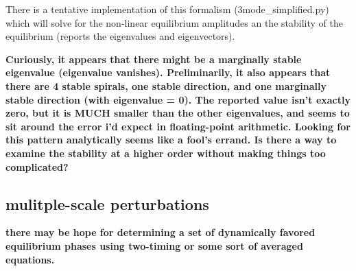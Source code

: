 There is a tentative implementation of this formalism (3mode\_simplified.py) which will solve for the non-linear equilibrium amplitudes an the stability of the equilibrium (reports the eigenvalues and eigenvectors).

\textbf{Curiously, it appears that there might be a marginally stable eigenvalue (eigenvalue vanishes). Preliminarily, it also appears that there are 4 stable spirals, one stable direction, and one marginally stable direction (with eigenvalue = 0). The reported value isn't exactly zero, but it is MUCH smaller than the other eigenvalues, and seems to sit around the error i'd expect in floating-point arithmetic. Looking for this pattern analytically seems like a fool's errand. Is there a way to examine the stability at a higher order without making things too complicated?}

\subsection*{mulitple-scale perturbations}

\textbf{there may be hope for determining a set of dynamically favored equilibrium phases using two-timing or some sort of averaged equations.}

